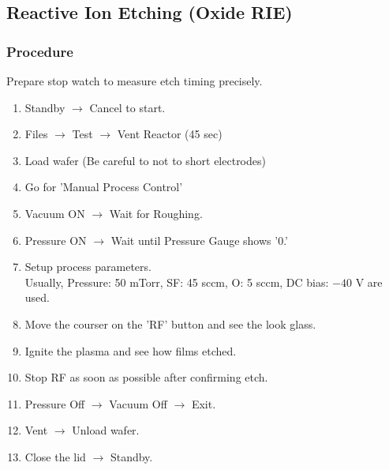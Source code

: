 \subsection{Reactive Ion Etching (Oxide RIE)}
\subsubsection{Procedure}
Prepare stop watch to measure etch timing precisely.
\begin{enumerate}
\item Standby $\rightarrow$ Cancel to start.
\item Files $\rightarrow$ Test $\rightarrow$ Vent Reactor (45 sec)
\item Load wafer (Be careful to not to short electrodes)
\item Go for 'Manual Process Control'
\item Vacuum ON $\rightarrow$ Wait for Roughing.
\item Pressure ON $\rightarrow$ Wait until Pressure Gauge shows '0.'
\item Setup process parameters. \\
  Usually, Pressure: 50 mTorr, SF: 45 sccm, O: 5 sccm, DC bias: $-40$ V are used.
\item Move the courser on the 'RF' button and see the look glass.
\item Ignite the plasma and see how films etched.
\item Stop RF as soon as possible after confirming etch.
\item Pressure Off $\rightarrow$ Vacuum Off $\rightarrow$ Exit.
\item Vent $\rightarrow$ Unload wafer.
\item Close the lid $\rightarrow$ Standby. 
\end{enumerate}
